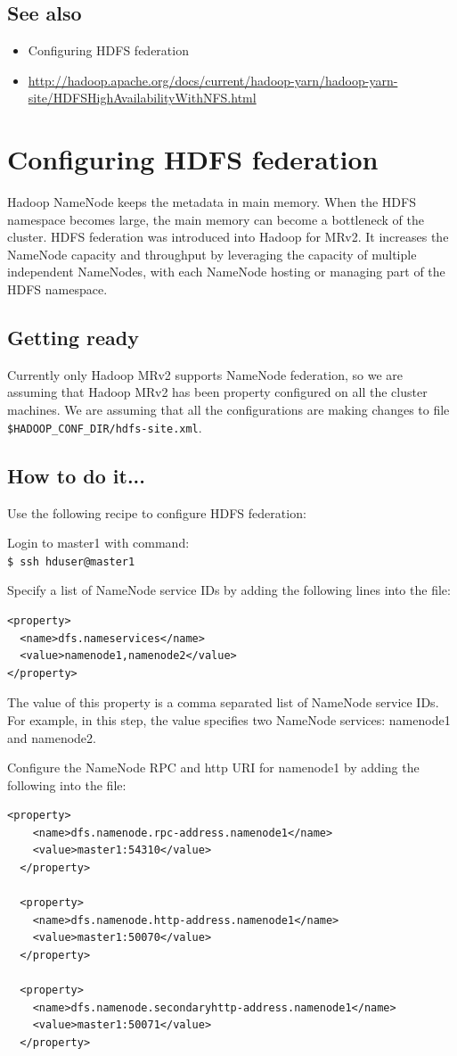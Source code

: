 \subsection*{See also}
\begin{itemize}
  \item Configuring HDFS federation
  \item \url{http://hadoop.apache.org/docs/current/hadoop-yarn/hadoop-yarn-site/HDFSHighAvailabilityWithNFS.html}
\end{itemize}

\section{Configuring HDFS federation}
Hadoop NameNode keeps the metadata in main memory. When the HDFS namespace becomes large, the main memory can become a bottleneck of the cluster. HDFS federation was introduced into Hadoop for MRv2. It increases the NameNode capacity and throughput by leveraging the capacity of multiple independent NameNodes, with each NameNode hosting or managing part of the HDFS namespace.
\subsection*{Getting ready}
Currently only Hadoop MRv2 supports NameNode federation, so we are assuming that Hadoop MRv2 has been property configured on all the cluster machines.
We are assuming that all the configurations are making changes to file \verb|$HADOOP_CONF_DIR/hdfs-site.xml|.
\subsection*{How to do it...}
 Use the following recipe to configure HDFS federation:

Login to master1 with command: \\
\verb|$ ssh hduser@master1|

Specify a list of NameNode service IDs by adding the following lines into the file:
\lstset{style=bashstyle}
\begin{lstlisting}
<property>
  <name>dfs.nameservices</name>
  <value>namenode1,namenode2</value>
</property>
\end{lstlisting}

The value of this property is a comma separated list of NameNode service IDs. For example, in this step, the value specifies two NameNode services: namenode1 and namenode2.

Configure the NameNode RPC and http URI for namenode1 by adding the following into the file:
\lstset{style=bashstyle}
\begin{lstlisting}
<property>
    <name>dfs.namenode.rpc-address.namenode1</name>
    <value>master1:54310</value>
  </property>

  <property>
    <name>dfs.namenode.http-address.namenode1</name>
    <value>master1:50070</value>
  </property>

  <property>
    <name>dfs.namenode.secondaryhttp-address.namenode1</name>
    <value>master1:50071</value>
  </property>
\end{lstlisting}

